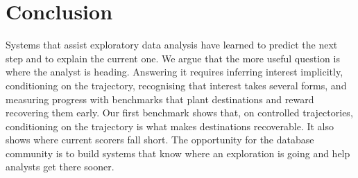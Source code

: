 \documentclass[sigconf]{acmart}
\begin{document}




\section{Conclusion}

Systems that assist exploratory data analysis have learned to predict the next step and to explain the current one. We argue that the more useful question is where the analyst is heading. Answering it requires inferring interest implicitly, conditioning on the trajectory, recognising that interest takes several forms, and measuring progress with benchmarks that plant destinations and reward recovering them early. Our first benchmark shows that, on controlled trajectories, conditioning on the trajectory is what makes destinations recoverable. It also shows where current scorers fall short. The opportunity for the database community is to build systems that know where an exploration is going and help analysts get there sooner.
\end{document}
